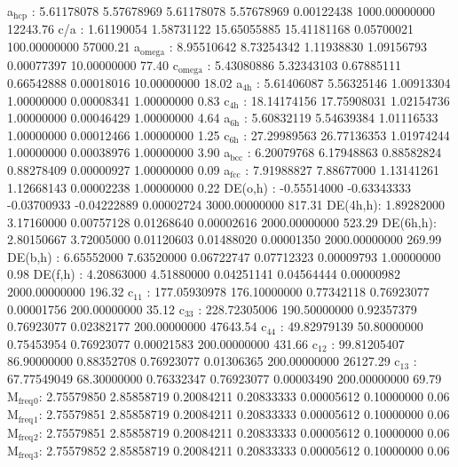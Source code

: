 \documentclass[11pt]{article}
\begin{document}
a\(_{\text{hcp}}\)   :   5.61178078   5.57678969   5.61178078   5.57678969   0.00122438 1000.00000000     12243.76
c/a     :   1.61190054   1.58731122  15.65055885  15.41181168   0.05700021 100.00000000     57000.21
a\(_{\text{omega}}\) :   8.95510642   8.73254342   1.11938830   1.09156793   0.00077397  10.00000000        77.40
c\(_{\text{omega}}\) :   5.43080886   5.32343103   0.67885111   0.66542888   0.00018016  10.00000000        18.02
a\(_{\text{4h}}\)    :   5.61406087   5.56325146   1.00913304   1.00000000   0.00008341   1.00000000         0.83
c\(_{\text{4h}}\)    :  18.14174156  17.75908031   1.02154736   1.00000000   0.00046429   1.00000000         4.64
a\(_{\text{6h}}\)    :   5.60832119   5.54639384   1.01116533   1.00000000   0.00012466   1.00000000         1.25
c\(_{\text{6h}}\)    :  27.29989563  26.77136353   1.01974244   1.00000000   0.00038976   1.00000000         3.90
a\(_{\text{bcc}}\)   :   6.20079768   6.17948863   0.88582824   0.88278409   0.00000927   1.00000000         0.09
a\(_{\text{fcc}}\)   :   7.91988827   7.88677000   1.13141261   1.12668143   0.00002238   1.00000000         0.22
DE(o,h) :  -0.55514000  -0.63343333  -0.03700933  -0.04222889   0.00002724 3000.00000000       817.31
DE(4h,h):   1.89282000   3.17160000   0.00757128   0.01268640   0.00002616 2000.00000000       523.29
DE(6h,h):   2.80150667   3.72005000   0.01120603   0.01488020   0.00001350 2000.00000000       269.99
DE(b,h) :   6.65552000   7.63520000   0.06722747   0.07712323   0.00009793   1.00000000         0.98
DE(f,h) :   4.20863000   4.51880000   0.04251141   0.04564444   0.00000982 2000.00000000       196.32
c\(_{\text{11}}\)    : 177.05930978 176.10000000   0.77342118   0.76923077   0.00001756 200.00000000        35.12
c\(_{\text{33}}\)    : 228.72305006 190.50000000   0.92357379   0.76923077   0.02382177 200.00000000     47643.54
c\(_{\text{44}}\)    :  49.82979139  50.80000000   0.75453954   0.76923077   0.00021583 200.00000000       431.66
c\(_{\text{12}}\)    :  99.81205407  86.90000000   0.88352708   0.76923077   0.01306365 200.00000000     26127.29
c\(_{\text{13}}\)    :  67.77549049  68.30000000   0.76332347   0.76923077   0.00003490 200.00000000        69.79
M\(_{\text{freq}}\)\(_{\text{0}}\):   2.75579850   2.85858719   0.20084211   0.20833333   0.00005612   0.10000000         0.06
M\(_{\text{freq}}\)\(_{\text{1}}\):   2.75579851   2.85858719   0.20084211   0.20833333   0.00005612   0.10000000         0.06
M\(_{\text{freq}}\)\(_{\text{2}}\):   2.75579851   2.85858719   0.20084211   0.20833333   0.00005612   0.10000000         0.06
M\(_{\text{freq}}\)\(_{\text{3}}\):   2.75579852   2.85858719   0.20084211   0.20833333   0.00005612   0.10000000         0.06
\end{document}
